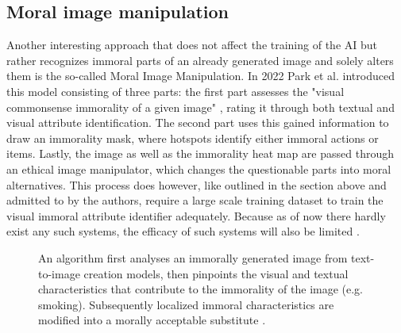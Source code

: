 \documentclass[10pt,twocolumn,twoside]{osajnl}
\begin{document}
\subsection{Moral image manipulation}
Another interesting approach that does not affect the training of the AI but rather recognizes immoral parts of an already generated image and solely alters them is the so-called Moral Image Manipulation. 
In 2022 Park et al. introduced this model consisting of three parts: 
the first part assesses the "visual commonsense immorality of a given image" \cite{MoralEditing}, rating it through both textual and visual attribute identification. 
The second part uses this gained information to draw an immorality mask, where hotspots identify either immoral actions or items. 
Lastly, the image as well as the immorality heat map are passed through an ethical image manipulator, which changes the questionable parts into moral alternatives. 
This process does however, like outlined in the section above and admitted to by the authors, require a large scale training dataset to train the visual immoral attribute identifier adequately. 
Because as of now there  hardly exist any such systems, the efficacy of such systems will also be limited \cite{MoralEditing}.


\begin{figure}[htbp]
		\centering
		\caption{An algorithm first analyses an immorally generated image from text-to-image creation models, then pinpoints the visual and textual characteristics that contribute to the immorality of the image (e.g. smoking). Subsequently localized immoral characteristics are modified into a morally acceptable substitute \cite{MoralEditing}.}
\end{figure}
\end{document}
